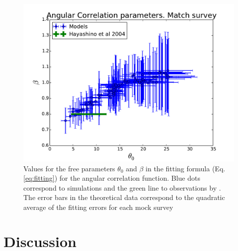 \documentclass[usenatbib]{mn2e}
\begin{document}
\begin{figure}
\begin{center}
\includegraphics[width=1.0\linewidth,angle=0]{power_law_correlation_degree2.pdf}  
\end{center}
\caption{Values for the free parameters $\theta_{0}$ and $\beta$
in the fitting formula (Eq. \ref{eq:fitting}) for the angular
correlation function. Blue dots correspond to simulations and the
green line to observations by \citet{Ouchi2010}. The error
bars in the theoretical data correspond to the quadratic average of
the fitting errors for each mock
survey \label{fig:correlation_parameters}} 
\end{figure} 


\section{Discussion}
\label{sec:discussion}
\end{document}
